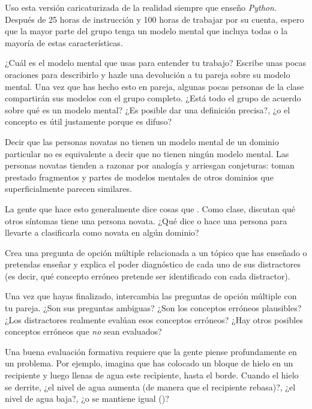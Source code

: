 Uso esta versión caricaturizada de la realidad siempre que enseño \emph{Python}.
Después de 25 horas de instrucción y 100 horas de trabajar por su cuenta,
espero que la mayor parte del grupo tenga un modelo mental
que incluya todas o la mayoría de estas características.



¿Cuál es el modelo mental que usas para entender tu trabajo?
Escribe unas pocas oraciones para describirlo y hazle una devolución a tu pareja sobre su modelo mental.
Una vez que has hecho esto en pareja,
algunas pocas personas de la clase compartirán sus modelos con el grupo completo.
¿Está todo el grupo de acuerdo sobre qué es un modelo mental?
¿Es posible dar una definición precisa?,
¿o el concepto es útil justamente porque es difuso?

Decir que las personas novatas no tienen un modelo mental de un dominio particular
no es equivalente a decir que no tienen ningún modelo mental.
Las personas novatas tienden a razonar por analogía y arriesgan conjeturas:
toman prestado fragmentos y partes de modelos mentales de otros dominios que superficialmente parecen similares.

La gente que hace esto generalmente dice cosas que .
Como clase,
discutan qué otros síntomas tiene una persona novata.
¿Qué dice o hace una persona para llevarte a clasificarla como novata en algún dominio?

Crea una pregunta de opción múltiple relacionada a un tópico que has enseñado o pretendas enseñar
y explica el poder diagnóstico de cada uno de sus distractores
(es decir, qué concepto erróneo pretende ser identificado con cada distractor).

Una vez que hayas finalizado, intercambia las preguntas de opción múltiple con tu pareja.
¿Son sus preguntas ambiguas?
¿Son los conceptos erróneos plausibles?
¿Los distractores realmente evalúan esos conceptos erróneos?
¿Hay otros posibles conceptos erróneos que \emph{no} sean evaluados?

Una buena evaluación formativa requiere que la gente piense profundamente en un problema.
Por ejemplo,
imagina que has colocado un bloque de hielo en un recipiente y luego llenas de agua este recìpiente, hasta el borde.
Cuando el hielo se derrite, ¿el nivel de agua aumenta (de manera que el recipiente rebasa)?, 
¿el nivel de agua baja?, ¿o se mantiene igual ()?

